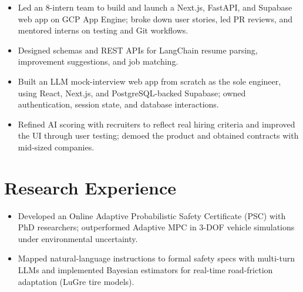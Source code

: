 \documentclass[11pt, letterpaper]{article}
\begin{document}
\vspace{1pt}
\begin{itemize}
  \item Led an 8-intern team to build and launch a Next.js, FastAPI, and Supabase web app on GCP App Engine; broke down user stories, led PR reviews, and mentored interns on testing and Git workflows.
  \item Designed schemas and REST APIs for LangChain resume parsing, improvement suggestions, and job matching.
\end{itemize}

\vspace{1pt}
\begin{itemize}
  \item Built an LLM mock-interview web app from scratch as the sole engineer, using React, Next.js, and PostgreSQL-backed Supabase; owned authentication, session state, and database interactions.
  \item Refined AI scoring with recruiters to reflect real hiring criteria and improved the UI through user testing; demoed the product and obtained contracts with mid-sized companies.
\end{itemize}

\section{Research Experience}
\begin{itemize}
  \item Developed an Online Adaptive Probabilistic Safety Certificate (PSC) with PhD researchers; outperformed Adaptive MPC in 3-DOF vehicle simulations under environmental uncertainty.
  \item Mapped natural-language instructions to formal safety specs with multi-turn LLMs and implemented Bayesian estimators for real-time road-friction adaptation (LuGre tire models).
\end{itemize}
\end{document}
